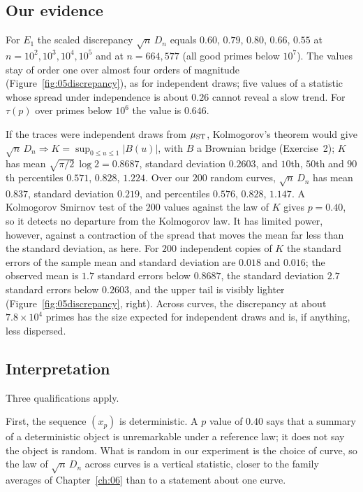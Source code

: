 \subsection{Our evidence}

For $E_1$ the scaled discrepancy $\sqrt n\,D_n$ equals $0.60$, $0.79$, $0.80$, $0.66$, $0.55$ at $n = 10^2, 10^3, 10^4, 10^5$ and at $n = 664{,}577$ (all good primes below $10^7$). The values stay of order one over almost four orders of magnitude (Figure~\ref{fig:05discrepancy}), as for independent draws; five values of a statistic whose spread under independence is about $0.26$ cannot reveal a slow trend. For $\tau(p)$ over primes below $10^6$ the value is $0.646$.

If the traces were independent draws from $\mu_{\mathrm{ST}}$, Kolmogorov's theorem \cite{kolmogorov1933} would give $\sqrt n\,D_n \Rightarrow K = \sup_{0\le u\le1}|B(u)|$, with $B$ a Brownian bridge (Exercise~2); $K$ has mean $\sqrt{\pi/2}\,\log 2 = 0.8687$, standard deviation $0.2603$, and $10$th, $50$th and $90$th percentiles $0.571$, $0.828$, $1.224$. Over our $200$ random curves, $\sqrt n\,D_n$ has mean $0.837$, standard deviation $0.219$, and percentiles $0.576$, $0.828$, $1.147$. A Kolmogorov Smirnov test of the $200$ values against the law of $K$ gives $p = 0.40$, so it detects no departure from the Kolmogorov law. It has limited power, however, against a contraction of the spread that moves the mean far less than the standard deviation, as here. For $200$ independent copies of $K$ the standard errors of the sample mean and standard deviation are $0.018$ and $0.016$; the observed mean is $1.7$ standard errors below $0.8687$, the standard deviation $2.7$ standard errors below $0.2603$, and the upper tail is visibly lighter (Figure~\ref{fig:05discrepancy}, right). Across curves, the discrepancy at about $7.8\times10^4$ primes has the size expected for independent draws and is, if anything, less dispersed.

\subsection{Interpretation}

Three qualifications apply.

First, the sequence $(x_p)$ is deterministic. A $p$ value of $0.40$ says that a summary of a deterministic object is unremarkable under a reference law; it does not say the object is random. What is random in our experiment is the choice of curve, so the law of $\sqrt n\,D_n$ across curves is a vertical statistic, closer to the family averages of Chapter~\ref{ch:06} than to a statement about one curve.

